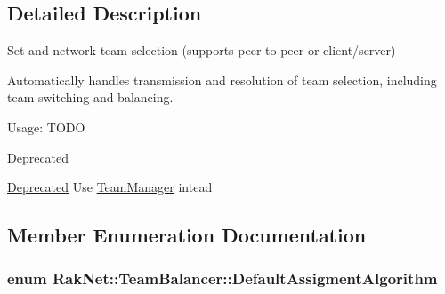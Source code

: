 \subsection{Detailed Description}
Set and network team selection (supports peer to peer or client/server) 

Automatically handles transmission and resolution of team selection, including team switching and balancing.\par
 Usage\-: T\-O\-D\-O \begin{DoxyRefDesc}{Deprecated}
\item[\hyperlink{deprecated__deprecated000012}{Deprecated}]Use \hyperlink{class_rak_net_1_1_team_manager}{Team\-Manager} intead \end{DoxyRefDesc}


\subsection{Member Enumeration Documentation}
\hypertarget{class_rak_net_1_1_team_balancer_a615ce461958441f9a0a559ba14610172}{
\subsubsection[{Default\-Assigment\-Algorithm}]{\setlength{\rightskip}{0pt plus 5cm}enum {\bf Rak\-Net\-::\-Team\-Balancer\-::\-Default\-Assigment\-Algorithm}}}\label{class_rak_net_1_1_team_balancer_a615ce461958441f9a0a559ba14610172}
